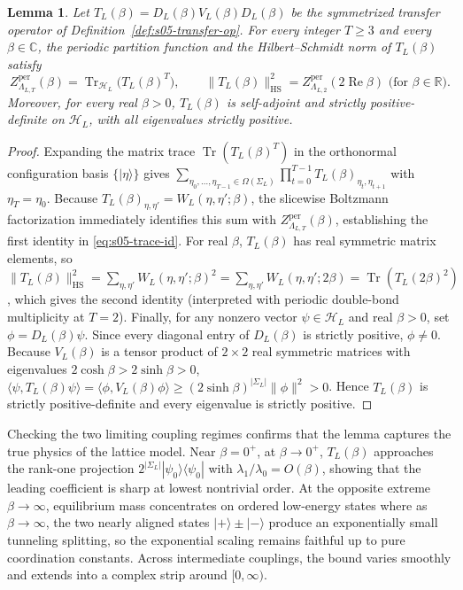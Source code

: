 \documentclass[11pt]{article}
\newtheorem{lemma}[theorem]{Lemma}
\theoremstyle{definition}
\begin{document}
\begin{lemma}
\label{lem:s05-hilbert-schmidt}
Let $T_L(\beta) = D_L(\beta) V_L(\beta) D_L(\beta)$ be the symmetrized transfer
operator of Definition~\ref{def:s05-transfer-op}. For every integer $T \ge 3$ and
every $\beta \in \mathbb{C}$, the periodic partition function and the
Hilbert--Schmidt norm of $T_L(\beta)$ satisfy
\begin{equation}
\label{eq:s05-trace-id}
  Z_{\Lambda_{L,T}}^{\mathrm{per}}(\beta) = \operatorname{Tr}_{\mathcal{H}_L}\!\bigl(T_L(\beta)^T\bigr), \qquad \|T_L(\beta)\|_{\mathrm{HS}}^2 = Z_{\Lambda_{L,2}}^{\mathrm{per}}(2\operatorname{Re}\beta) \text{ (for } \beta \in \mathbb{R}\text{)}.
\end{equation}
Moreover, for every real $\beta > 0$, $T_L(\beta)$ is self-adjoint and strictly
positive-definite on $\mathcal{H}_L$, with all eigenvalues strictly positive.
\end{lemma}
\begin{proof}
Expanding the matrix trace $\operatorname{Tr}(T_L(\beta)^T)$ in the orthonormal
configuration basis $\{|\eta\rangle\}$ gives $\sum_{\eta_0, \dots, \eta_{T-1} \in
\Omega(\Sigma_L)} \prod_{t=0}^{T-1} T_L(\beta)_{\eta_t, \eta_{t+1}}$ with $\eta_T =
\eta_0$. Because $T_L(\beta)_{\eta, \eta'} = W_L(\eta, \eta'; \beta)$, the slicewise
Boltzmann factorization immediately identifies this sum with
$Z_{\Lambda_{L,T}}^{\mathrm{per}}(\beta)$, establishing the first identity in
\eqref{eq:s05-trace-id}. For real $\beta$, $T_L(\beta)$ has real symmetric matrix
elements, so $\|T_L(\beta)\|_{\mathrm{HS}}^2 = \sum_{\eta, \eta'} W_L(\eta, \eta';
\beta)^2 = \sum_{\eta, \eta'} W_L(\eta, \eta'; 2\beta) =
\operatorname{Tr}(T_L(2\beta)^2)$, which gives the second identity (interpreted with
periodic double-bond multiplicity at $T = 2$). Finally, for any nonzero vector $\psi
\in \mathcal{H}_L$ and real $\beta > 0$, set $\phi = D_L(\beta) \psi$. Since every
diagonal entry of $D_L(\beta)$ is strictly positive, $\phi \neq 0$. Because
$V_L(\beta)$ is a tensor product of $2 \times 2$ real symmetric matrices with
eigenvalues $2\cosh\beta > 2\sinh\beta > 0$, $\langle \psi, T_L(\beta) \psi \rangle
= \langle \phi, V_L(\beta) \phi \rangle \ge (2\sinh\beta)^{|\Sigma_L|} \|\phi\|^2 >
0$. Hence $T_L(\beta)$ is strictly positive-definite and every eigenvalue is
strictly positive.
\end{proof}

Checking the two limiting coupling regimes confirms that the lemma captures the true
physics of the lattice model. Near $\beta = 0^+$, at $\beta \to 0^+$, $T_L(\beta)$
approaches the rank-one projection $2^{|\Sigma_L|} |\psi_0\rangle\langle\psi_0|$
with $\lambda_1/\lambda_0 = O(\beta)$, showing that the leading coefficient is sharp
at lowest nontrivial order. At the opposite extreme $\beta \to \infty$, equilibrium
mass concentrates on ordered low-energy states where as $\beta \to \infty$, the two
nearly aligned states $|+\rangle \pm |-\rangle$ produce an exponentially small
tunneling splitting, so the exponential scaling remains faithful up to pure
coordination constants. Across intermediate couplings, the bound varies smoothly and
extends into a complex strip around $[0, \infty)$.
\end{document}
